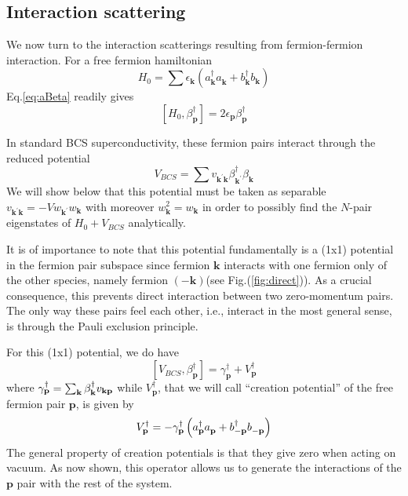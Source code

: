 \documentclass[epj]{svjour}
\newcommand{\vk}{\ensuremath{\mathbf{k}}}
\newcommand{\vp}{\ensuremath{\mathbf{p}}}
\begin{document}
\subsection{Interaction scattering}

We now turn to the interaction scatterings resulting from fermion-fermion interaction. For a free fermion hamiltonian 
\begin{equation}  \label{eq:h0}
H_0=\sum{\epsilon_\vk\left(a^{\dagger}_{\mathbf{k} } a^{}_{\mathbf{k}
}+b^{\dagger}_{\mathbf{k} } b^{}_{\mathbf{k} }\right) }
\end{equation}
Eq.\eqref{eq:aBeta} readily gives 
\begin{equation}  \label{eq:betaH}
\left[H_0,\beta^{\dagger}_\vp\right]  =2\epsilon_\vp\beta^{\dagger}_\vp
\end{equation}

In  standard BCS superconductivity, these fermion pairs interact through the reduced potential
\begin{equation}  \label{eq:vbcs}
V_{BCS}=\sum{v_{\mathbf{k} ^{\prime}\mathbf{k} }\beta^{\dagger}_{\mathbf{k}
^{\prime}}\beta^{}_{\mathbf{k} }}
\end{equation}
We will show below that this potential must be taken as separable $v_{\mathbf{k} ^{\prime}\mathbf{k}}=-Vw_{\mathbf{k} ^{\prime} }w_\vk$ with moreover $w_\vk^2=w_\vk$ in order to possibly find the $N$-pair eigenstates of $H_0+V_{BCS}$ analytically.


It is of importance to note that this potential fundamentally is a (1x1) potential in the fermion pair subspace since fermion $\mathbf{k}$ 
interacts with one fermion only of the other
species, namely fermion $\left(-\mathbf{k} \right)$(see Fig.(\ref{fig:direct})). As a crucial consequence, this prevents direct interaction between two zero-momentum pairs. The only way these pairs feel each other, i.e., interact in the most general sense, is through the Pauli exclusion principle. 


  For this (1x1)
potential, we do have 
\begin{equation}  \label{eq:vbeta}
\left[V_{BCS},\beta^{\dagger}_\vp\right] 
=\gamma^{\dagger}_\vp+V^{\dagger}_\vp
\end{equation}
where $\gamma^{\dagger}_\vp=\sum_\vk\beta^{\dagger}_\vk{}v_{%
\mathbf{k} \mathbf{p} }$ while $V^{\dagger}_\vp$, that we will call ``creation potential''  of the free fermion pair 
$\mathbf{p} $, is given by 
\begin{equation}  \label{eq:betaV}
V^{\dagger}_\vp=-{\gamma^{\dagger}_\vp}\left(a^{\dagger}_{\mathbf{p} }a^{}_{%
\mathbf{p} }+b^{\dagger}_{-\mathbf{p} }b^{}_{-\mathbf{p} }\right) 
\end{equation}
The general property of creation potentials is that they give zero when acting on vacuum. As now shown, this operator allows us to generate the interactions of the $\vp$ pair with the rest of the system.
\end{document}
